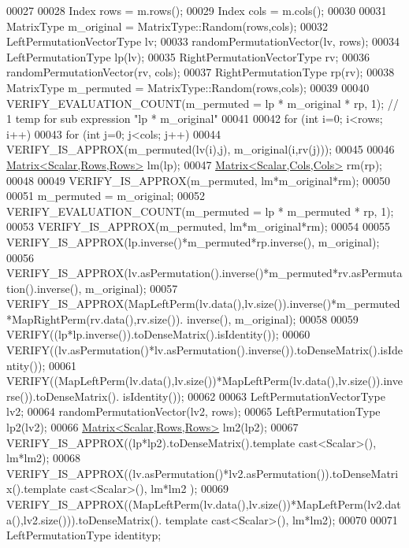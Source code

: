 \begin{DoxyCode}
00027 
00028   Index rows = m.rows();
00029   Index cols = m.cols();
00030 
00031   MatrixType m\_original = MatrixType::Random(rows,cols);
00032   LeftPermutationVectorType lv;
00033   randomPermutationVector(lv, rows);
00034   LeftPermutationType lp(lv);
00035   RightPermutationVectorType rv;
00036   randomPermutationVector(rv, cols);
00037   RightPermutationType rp(rv);
00038   MatrixType m\_permuted = MatrixType::Random(rows,cols);
00039   
00040   VERIFY\_EVALUATION\_COUNT(m\_permuted = lp * m\_original * rp, 1); \textcolor{comment}{// 1 temp for sub expression "lp *
       m\_original"}
00041 
00042   \textcolor{keywordflow}{for} (\textcolor{keywordtype}{int} i=0; i<rows; i++)
00043     \textcolor{keywordflow}{for} (\textcolor{keywordtype}{int} j=0; j<cols; j++)
00044         VERIFY\_IS\_APPROX(m\_permuted(lv(i),j), m\_original(i,rv(j)));
00045 
00046   \hyperlink{group___core___module_class_eigen_1_1_matrix}{Matrix<Scalar,Rows,Rows>} lm(lp);
00047   \hyperlink{group___core___module_class_eigen_1_1_matrix}{Matrix<Scalar,Cols,Cols>} rm(rp);
00048 
00049   VERIFY\_IS\_APPROX(m\_permuted, lm*m\_original*rm);
00050   
00051   m\_permuted = m\_original;
00052   VERIFY\_EVALUATION\_COUNT(m\_permuted = lp * m\_permuted * rp, 1);
00053   VERIFY\_IS\_APPROX(m\_permuted, lm*m\_original*rm);
00054   
00055   VERIFY\_IS\_APPROX(lp.inverse()*m\_permuted*rp.inverse(), m\_original);
00056   VERIFY\_IS\_APPROX(lv.asPermutation().inverse()*m\_permuted*rv.asPermutation().inverse(), m\_original);
00057   VERIFY\_IS\_APPROX(MapLeftPerm(lv.data(),lv.size()).inverse()*m\_permuted*MapRightPerm(rv.data(),rv.size()).
      inverse(), m\_original);
00058   
00059   VERIFY((lp*lp.inverse()).toDenseMatrix().isIdentity());
00060   VERIFY((lv.asPermutation()*lv.asPermutation().inverse()).toDenseMatrix().isIdentity());
00061   VERIFY((MapLeftPerm(lv.data(),lv.size())*MapLeftPerm(lv.data(),lv.size()).inverse()).toDenseMatrix().
      isIdentity());
00062 
00063   LeftPermutationVectorType lv2;
00064   randomPermutationVector(lv2, rows);
00065   LeftPermutationType lp2(lv2);
00066   \hyperlink{group___core___module_class_eigen_1_1_matrix}{Matrix<Scalar,Rows,Rows>} lm2(lp2);
00067   VERIFY\_IS\_APPROX((lp*lp2).toDenseMatrix().\textcolor{keyword}{template} cast<Scalar>(), lm*lm2);
00068   VERIFY\_IS\_APPROX((lv.asPermutation()*lv2.asPermutation()).toDenseMatrix().template cast<Scalar>(), lm*lm2
      );
00069   VERIFY\_IS\_APPROX((MapLeftPerm(lv.data(),lv.size())*MapLeftPerm(lv2.data(),lv2.size())).toDenseMatrix().
      template cast<Scalar>(), lm*lm2);
00070 
00071   LeftPermutationType identityp;

\end{DoxyCode}
